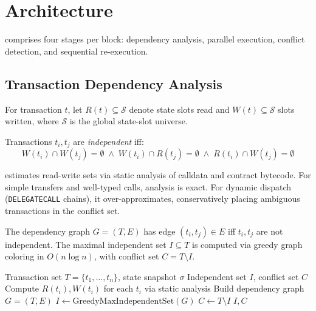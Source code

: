 \section{Architecture}

\label{sec:architecture}

\cevm{} comprises four stages per block: dependency analysis, parallel execution, conflict detection, and sequential re-execution.

\subsection{Transaction Dependency Analysis}

\begin{definition}
For transaction $t$, let $R(t) \subseteq \mathcal{S}$ denote state slots read and $W(t) \subseteq \mathcal{S}$ slots written, where $\mathcal{S}$ is the global state-slot universe.
\end{definition}

\begin{definition}[Independence]
Transactions $t_i, t_j$ are \emph{independent} iff:
\begin{equation}
W(t_i) \cap W(t_j) = \emptyset \;\wedge\; W(t_i) \cap R(t_j) = \emptyset \;\wedge\; R(t_i) \cap W(t_j) = \emptyset
\end{equation}
\end{definition}

\cevm{} estimates read-write sets via static analysis of calldata and contract bytecode.
For simple transfers and well-typed calls, analysis is exact.
For dynamic dispatch (\texttt{DELEGATECALL} chains), it over-approximates, conservatively placing ambiguous transactions in the conflict set.

The dependency graph $G = (T, E)$ has edge $(t_i, t_j) \in E$ iff $t_i, t_j$ are not independent.
The maximal independent set $I \subseteq T$ is computed via greedy graph coloring in $O(n \log n)$, with conflict set $C = T \setminus I$.

\begin{algorithm}
\caption{Transaction Partitioning}
\label{alg:partition}
\begin{algorithmic}[1]
\REQUIRE Transaction set $T = \{t_1, \ldots, t_n\}$, state snapshot $\sigma$
\ENSURE Independent set $I$, conflict set $C$
\STATE Compute $R(t_i), W(t_i)$ for each $t_i$ via static analysis
\STATE Build dependency graph $G = (T, E)$
\STATE $I \gets \text{GreedyMaxIndependentSet}(G)$
\STATE $C \gets T \setminus I$
\RETURN $I, C$
\end{algorithmic}
\end{algorithm}

